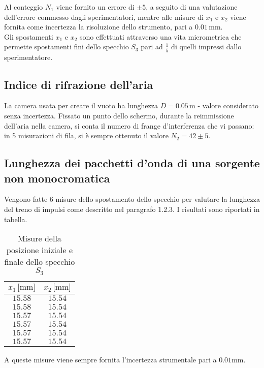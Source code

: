 \documentclass[]{article}
\let\oldsubsection\subsection%
\renewcommand{\subsection}{%
	\renewcommand{\theequation}{\thesubsection.\arabic{equation}}%
	\oldsubsection}%
\begin{document}
Al conteggio $N_1$ viene fornito un errore di $ \pm 5$, a seguito di una valutazione dell'errore commesso dagli sperimentatori, mentre alle misure di $x_1$ e $x_2$ viene fornita come incertezza la risoluzione dello strumento, pari a $0.01 \, \text{mm}$. \\ Gli spostamenti $x_1$ e $x_2$ sono effettuati attraverso una vita micrometrica che permette spostamenti fini dello specchio $S_3$ pari ad $\frac{1}{5}$ di quelli impressi dallo sperimentatore. 


\subsection{Indice di rifrazione dell'aria}
\label{par:n_a}

La camera usata per creare il vuoto ha lunghezza $D=0.05 \, \text{m}$ - valore considerato senza incertezza. Fissato un punto dello schermo, durante la reimmissione dell'aria nella camera, si conta il numero di frange d'interferenza che vi passano: in 5 misurazioni di fila, si è sempre ottenuto il valore $N_2 = 42 \pm 5$.

\subsection{Lunghezza dei pacchetti d'onda di una sorgente non monocromatica}

Vengono fatte 6 misure dello spostamento dello specchio per valutare la lunghezza del treno di impulsi come descritto nel paragrafo 1.2.3. I risultati sono riportati in tabella.

\begin{table}[H]
    \centering

    \begin{tabular}{||c|c||}
        \hline
        $x_1 \, \text{[mm]}$ & $x_2\, \text{[mm]}$ \\
        \hline\hline

        $15.58$ & $15.54$ \\\hline
        $15.58$ & $15.54$ \\\hline
        $15.57$ & $15.54$ \\\hline
        $15.57$ & $15.54$ \\\hline
        $15.57$ & $15.54$ \\\hline
        $15.57$ & $15.54$ \\\hline
    
    \end{tabular}
    \caption{Misure della posizione iniziale e finale dello specchio $S_3$}
    \label{L}    
\end{table}
A queste misure viene sempre fornita l'incertezza strumentale pari a $0.01\text{mm}$.
\end{document}
